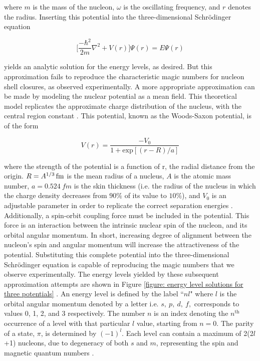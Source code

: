where $m$ is the mass of the nucleon, $\omega$ is the oscillating frequency, and $r$ denotes the radius. Inserting this potential into the three-dimensional Schr\"odinger equation

\begin{equation}
\Bigg[\frac{-\hbar^2}{2m}\nabla^2+V(r)\Bigg]\Psi(r) = E\Psi(r)
\label{equation: 3D schrodinger}
\end{equation}

yields an analytic solution for the energy levels, as desired.  But this approximation fails to reproduce the characteristic magic numbers for nucleon shell closures, as observed experimentally. A more appropriate approximation can be made by modeling the nuclear potential as a mean field. This theoretical model replicates the approximate charge distribution of the nucleus, with the central region constant \cite{CastenText}. This potential, known as the Woods-Saxon potential, is of the form

\begin{equation}
V(r) = \frac{-V_0}{1+\mathrm{exp}[(r-R)/a]}
\label{equation: woods-saxon potential}
\end{equation}

where the strength of the potential is a function of r, the radial distance from the origin. $R = A^{1/3}\mskip\thinmuskip \mathrm{fm}$ is the mean radius of a nucleus, $A$ is the atomic mass number, $a=\SI{0.524}{fm}$ is the skin thickness (i.e. the radius of the nucleus in which the charge density decreases from $90\%$ of its value to $10\%$), and $V_0$ is an adjustable parameter in order to replicate the correct separation energies \cite{KraneText}. Additionally, a spin-orbit coupling force must be included in the potential. This force is an interaction between the intrinsic nuclear spin of the nucleon, and its orbital angular momentum. In short, increasing degree of alignment between the nucleon's spin and angular momentum will increase the attractiveness of the potential. Substituting this complete potential into the three-dimensional Schr\"odinger equation is capable of reproducing the magic numbers that we observe experimentally. The energy levels yielded by these subsequent approximation attempts are shown in Figure \ref{figure: energy level solutions for three potentials} \cite{KraneText}. An energy level is defined by the label ``$nl$" where $l$ is the orbital angular momentum denoted by a letter i.e. $s, \ p, \ d, \ f,$ corresponds to values 0, 1, 2, and 3 respectively. The number $n$ is an index denoting the $n^\mathrm{th}$ occurrence of a level with that particular $l$ value, starting from $n=0$. The parity of a state, $\pi$, is determined by $(-1)^l$. Each level can contain a maximum of 2(2$l$+1) nucleons, due to degeneracy of both $s$ and $m$, representing the spin and magnetic quantum numbers \cite{KraneText}.  

